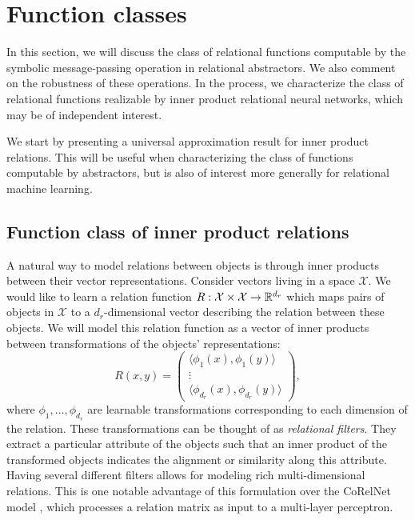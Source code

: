 \def\rdot{\bigcdot}
\def\F{{\mathfrak{F}}}
\def\MLP{\text{MLP}}

\section{Function classes}
\label{sec:function_spaces}

In this section, we will discuss the class of relational functions computable by the symbolic message-passing operation in relational abstractors. We also comment on the robustness of these operations. In the process, we characterize the class of relational functions realizable by inner product relational neural networks, which may be of independent interest.

We start by presenting a universal approximation result for inner product relations. This will be useful when characterizing the class of functions computable by abstractors, but is also of interest more generally for relational machine learning.

\subsection{Function class of inner product relations}

A natural way to model relations between objects is through inner products between their vector representations. Consider vectors living in a space \(\mathcal{X}\). We would like to learn a relation function \(R: \mathcal{X} \times \mathcal{X} \to \mathbb{R}^{d_r}\) which maps pairs of objects in \(\mathcal{X}\) to a \(d_r\)-dimensional vector describing the relation between these objects. We will model this relation function as a vector of inner products between transformations of the objects' representations:
\begin{equation}
	\label{eq:inner_product_relations}
	R(x, y) = \begin{pmatrix}\langle \phi_{1}(x), \phi_{1}(y) \rangle \\ \vdots \\ \langle \phi_{d_r}(x), \phi_{d_r}(y) \rangle \end{pmatrix},
\end{equation}
where \(\phi_{1}, \ldots, \phi_{d_r}\) are learnable transformations corresponding to each dimension of the relation. These transformations can be thought of as \textit{relational filters}. They extract a particular attribute of the objects such that an inner product of the transformed objects indicates the alignment or similarity along this attribute. Having several different filters allows for modeling rich multi-dimensional relations. This is one notable advantage of this formulation over the CoRelNet model \citep{kerg2022neural}, which processes a relation matrix as input to a multi-layer perceptron.

